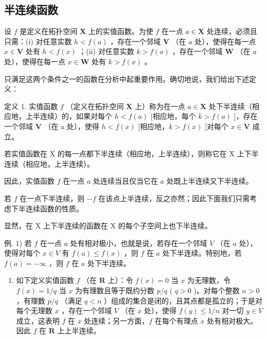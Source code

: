 \subsection{半连续函数}

设 \(f\) 是定义在拓扑空间 \(\mathbf{X}\) 上的实值函数。为使 \(f\) 在一点 \(a \in \mathbf{X}\) 处连续，必须且只需：(i) 对任意实数 \(h < f(a)\) ，存在一个邻域 \(\mathbf{V}\) （在 \(a\) 处），使得在每一点 \(x \in \mathbf{V}\) 处有 \(h < f(x)\) ；(ii) 对任意实数 \(k > f(a)\) ，存在一个邻域 \(\mathbf{W}\) （在 \(a\) 处），使得在每一点 \(x \in \mathbf{W}\) 处有 \(k > f(x)\) 。

只满足这两个条件之一的函数在分析中起重要作用。确切地说，我们给出下述定义：

定义 1. 实值函数 \(f\) （定义在拓扑空间 \(\mathbf{X}\) 上）称为在一点 \(a \in \mathbf{X}\) 处下半连续（相应地，上半连续）的，如果对每个 \(h < f(a)\) {[}相应地，每个 \(k > f(a)\) {]}，存在一个邻域 \(\mathbf{V}\) （在 a 处），使得 \(h < f(x)\) {[}相应地，\(k > f(x)\) {]}对每个 \(x \in \mathbf{V}\) 成立。

若实值函数在 X 的每一点都下半连续（相应地，上半连续），则称它在 X 上下半连续（相应地，上半连续）。

因此，实值函数 \(f\) 在一点 \(a\) 处连续当且仅当它在 \(a\) 处既上半连续又下半连续。

若 \(f\) 在一点下半连续，则 \(-f\) 在该点上半连续，反之亦然；因此下面我们只需考虑下半连续函数的性质。

显然，在 X 上下半连续的函数在 X 的每个子空间上也下半连续。

例. 1) 若 \(f\) 在一点 \(a\) 处有相对极小，也就是说，若存在一个邻域 \(V\) （在 \(a\) 处），使得对每个 \(x \in V\) 有 \(f(a) \leqslant f(x)\) ，则 \(f\) 在 \(a\) 处下半连续。特别地，若 \(f(a) = -\infty\) ，则 \(f\) 在 \(a\) 处下半连续。

\begin{enumerate}
\def\labelenumi{\arabic{enumi})}
\setcounter{enumi}{1}
\tightlist
\item
  如下定义实值函数 \(f\) （在 \(\mathbf{R}\) 上）：令 \(f(x) = 0\) 当 \(x\) 为无理数，令 \(f(x) = 1 / q\) 当 \(x\) 为有理数且等于既约分数 \(p / q\) ( \(q > 0\) )。对每个整数 \(n > 0\) ，有理数 \(p / q\) （满足 \(q < n\) ）组成的集合是闭的，且其点都是孤立的；于是对每个无理数 \(x\) ，存在一个邻域 \(V\) （在 \(x\) 处），使得 \(f(y) \leqslant 1 / n\) 对一切 \(y \in V\) 成立，这表明 \(f\) 在 \(x\) 处连续；另一方面，\(f\) 在每个有理点 \(x\) 处有相对极大。因此 \(f\) 在 \(\mathbf{R}\) 上上半连续。
\end{enumerate}

